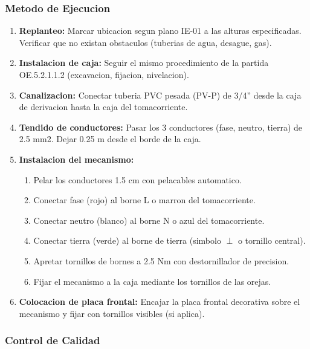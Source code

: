 \subsubsection{Metodo de Ejecucion}

\begin{enumerate}
  \item \textbf{Replanteo:} Marcar ubicacion segun plano IE-01 a las alturas especificadas. Verificar que no existan obstaculos (tuberias de agua, desague, gas).
  \item \textbf{Instalacion de caja:} Seguir el mismo procedimiento de la partida OE.5.2.1.1.2 (excavacion, fijacion, nivelacion).
  \item \textbf{Canalizacion:} Conectar tuberia PVC pesada (PV-P) de 3/4'' desde la caja de derivacion hasta la caja del tomacorriente.
  \item \textbf{Tendido de conductores:} Pasar los 3 conductores (fase, neutro, tierra) de 2.5 mm2. Dejar 0.25 m desde el borde de la caja.
  \item \textbf{Instalacion del mecanismo:}
  \begin{enumerate}
    \item Pelar los conductores 1.5 cm con pelacables automatico.
    \item Conectar fase (rojo) al borne L o marron del tomacorriente.
    \item Conectar neutro (blanco) al borne N o azul del tomacorriente.
    \item Conectar tierra (verde) al borne de tierra (simbolo $\perp$ o tornillo central).
    \item Apretar tornillos de bornes a 2.5 Nm con destornillador de precision.
    \item Fijar el mecanismo a la caja mediante los tornillos de las orejas.
  \end{enumerate}
  \item \textbf{Colocacion de placa frontal:} Encajar la placa frontal decorativa sobre el mecanismo y fijar con tornillos visibles (si aplica).
\end{enumerate}

\subsubsection{Control de Calidad}

